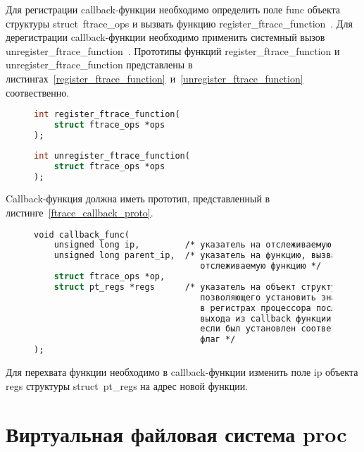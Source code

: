 Для регистрации callback-функции необходимо определить поле func объекта структуры struct~ftrace\_ops и вызвать функцию register\_ftrace\_function~\cite{ftrace}.
Для дерегистрации callback-функции необходимо применить системный вызов unregister\_ftrace\_function~\cite{ftrace}.
Прототипы функций register\_ftrace\_function и unregister\_ftrace\_function представлены в листингах~\ref{register_ftrace_function}~и~\ref{unregister_ftrace_function} соотвественно.
\begin{figure}[H]
	\begin{lstlisting}[label=register_ftrace_function,caption=Прототип функции register\_ftrace\_function (версия ядра Linux~--- 6.5.13),language=Caml]
int register_ftrace_function(
	struct ftrace_ops *ops
);
	\end{lstlisting}
\end{figure}
\begin{figure}[H]
	\begin{lstlisting}[label=unregister_ftrace_function,caption=Прототип функции unregister\_ftrace\_function (версия ядра Linux~--- 6.5.13),language=Caml]
int unregister_ftrace_function(
	struct ftrace_ops *ops
);
	\end{lstlisting}
\end{figure}

Callback-функция должна иметь прототип, представленный в листинге~\ref{ftrace_callback_proto}.
\begin{figure}[H]
	\begin{lstlisting}[label=ftrace_callback_proto,caption=Прототип callback-функции для работы с ftrace,language=Caml]
void callback_func(
	unsigned long ip,         /* указатель на отслеживаемую функцию */
	unsigned long parent_ip,  /* указатель на функцию, вызвавшая
	                             отслеживаемую функцию */
	struct ftrace_ops *op,
	struct pt_regs *regs      /* указатель на объект структуры,
	                             позволяющего установить значения
	                             в регистрах процессора после
	                             выхода из callback функции,
	                             если был установлен соответствующий
	                             флаг */
);
	\end{lstlisting}
\end{figure}

Для перехвата функции необходимо в callback-функции изменить поле ip объекта regs структуры struct~pt\_regs на адрес новой функции.

\section{Виртуальная файловая система proc}

